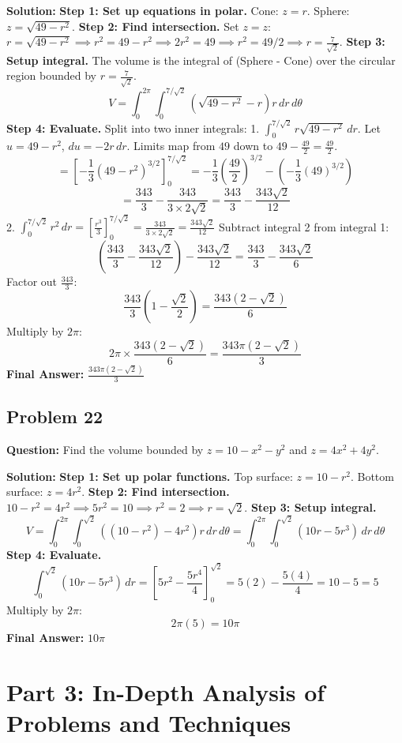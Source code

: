 \documentclass[12pt]{article}
\begin{document}
\textbf{Solution:}
\textbf{Step 1: Set up equations in polar.}
Cone: $z = r$.
Sphere: $z = \sqrt{49 - r^2}$.
\textbf{Step 2: Find intersection.}
Set $z = z$: $r = \sqrt{49 - r^2} \implies r^2 = 49 - r^2 \implies 2r^2 = 49 \implies r^2 = 49/2 \implies r = \frac{7}{\sqrt{2}}$.
\textbf{Step 3: Setup integral.}
The volume is the integral of (Sphere - Cone) over the circular region bounded by $r = \frac{7}{\sqrt{2}}$.
\[ V = \int_0^{2\pi} \int_0^{7/\sqrt{2}} \left( \sqrt{49-r^2} - r \right) r \, dr \, d\theta \]
\textbf{Step 4: Evaluate.}
Split into two inner integrals:
1. $\int_0^{7/\sqrt{2}} r\sqrt{49-r^2} \, dr$. Let $u = 49-r^2$, $du = -2r \, dr$. 
Limits map from $49$ down to $49 - \frac{49}{2} = \frac{49}{2}$.
\[ = \left[ -\frac{1}{3}(49-r^2)^{3/2} \right]_0^{7/\sqrt{2}} = -\frac{1}{3}\left(\frac{49}{2}\right)^{3/2} - \left(-\frac{1}{3}(49)^{3/2}\right) \]
\[ = \frac{343}{3} - \frac{343}{3 \times 2\sqrt{2}} = \frac{343}{3} - \frac{343\sqrt{2}}{12} \]
2. $\int_0^{7/\sqrt{2}} r^2 \, dr = \left[ \frac{r^3}{3} \right]_0^{7/\sqrt{2}} = \frac{343}{3 \times 2\sqrt{2}} = \frac{343\sqrt{2}}{12}$
Subtract integral 2 from integral 1:
\[ \left( \frac{343}{3} - \frac{343\sqrt{2}}{12} \right) - \frac{343\sqrt{2}}{12} = \frac{343}{3} - \frac{343\sqrt{2}}{6} \]
Factor out $\frac{343}{3}$:
\[ \frac{343}{3} \left( 1 - \frac{\sqrt{2}}{2} \right) = \frac{343(2-\sqrt{2})}{6} \]
Multiply by $2\pi$:
\[ 2\pi \times \frac{343(2-\sqrt{2})}{6} = \frac{343\pi(2-\sqrt{2})}{3} \]
\textbf{Final Answer:} $\frac{343\pi(2-\sqrt{2})}{3}$

\subsection*{Problem 22}
\textbf{Question:} Find the volume bounded by $z = 10-x^2-y^2$ and $z = 4x^2+4y^2$.

\textbf{Solution:}
\textbf{Step 1: Set up polar functions.}
Top surface: $z = 10 - r^2$.
Bottom surface: $z = 4r^2$.
\textbf{Step 2: Find intersection.}
$10 - r^2 = 4r^2 \implies 5r^2 = 10 \implies r^2 = 2 \implies r = \sqrt{2}$.
\textbf{Step 3: Setup integral.}
\[ V = \int_0^{2\pi} \int_0^{\sqrt{2}} \left( (10 - r^2) - 4r^2 \right) r \, dr \, d\theta = \int_0^{2\pi} \int_0^{\sqrt{2}} (10r - 5r^3) \, dr \, d\theta \]
\textbf{Step 4: Evaluate.}
\[ \int_0^{\sqrt{2}} (10r - 5r^3) \, dr = \left[ 5r^2 - \frac{5r^4}{4} \right]_0^{\sqrt{2}} = 5(2) - \frac{5(4)}{4} = 10 - 5 = 5 \]
Multiply by $2\pi$:
\[ 2\pi(5) = 10\pi \]
\textbf{Final Answer:} $10\pi$

\newpage
\section{Part 3: In-Depth Analysis of Problems and Techniques}
\end{document}
